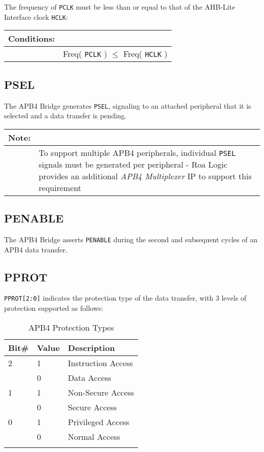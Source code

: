 The frequency of \texttt{PCLK} must be less than or equal to that of the AHB-Lite
Interface clock \texttt{HCLK}:

\begin{longtable}[]{@{}|rp{12cm}@{}}
	\textbf{Conditions}: & \\
	\endhead
	 & Freq( \texttt{PCLK} ) $\leqslant$ Freq( \texttt{HCLK} )\\
\end{longtable}	

\subsection{PSEL}\label{psel}

The APB4 Bridge generates \texttt{PSEL}, signaling to an attached peripheral that
it is selected and a data transfer is pending.

\begin{longtable}[]{@{}|p{2cm}p{12cm}@{}}
\textbf{Note:} & \\
\endhead
& To support multiple APB4 peripherals, individual \texttt{PSEL}
signals must be generated per peripheral - Roa Logic provides an
additional \emph{APB4 Multiplexer} IP to support this
requirement\tabularnewline

\end{longtable}

\subsection{PENABLE}\label{penable}

The APB4 Bridge asserts \texttt{PENABLE} during the second and
subsequent cycles of an APB4 data transfer.

\subsection{PPROT}\label{pprot}

\texttt{PPROT[2:0]} indicates the protection type of the data transfer, with
3 levels of protection supported as follows:

\begin{longtable}[]{@{}lll@{}}
\toprule
Bit\# & Value & Description\tabularnewline
\midrule
\endhead
2 & 1 & Instruction Access\tabularnewline
  & 0 & Data Access\tabularnewline
1 & 1 & Non-Secure Access\tabularnewline
  & 0 & Secure Access\tabularnewline
0 & 1 & Privileged Access\tabularnewline
  & 0 & Normal Access\tabularnewline
\bottomrule
\caption{APB4 Protection Types}
\end{longtable}

